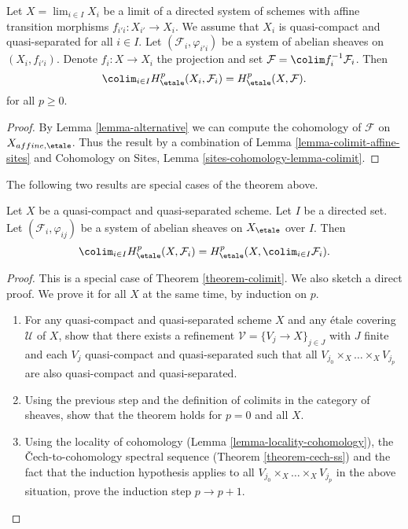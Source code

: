 \begin{theorem}
\label{theorem-colimit}
Let $X = \lim_{i \in I} X_i$ be a limit of a directed system of schemes
with affine transition morphisms $f_{i'i} : X_{i'} \to X_i$. We assume
that $X_i$ is quasi-compact and quasi-separated for all $i \in I$.
Let $(\mathcal{F}_i, \varphi_{i'i})$ be a system of abelian sheaves
on $(X_i, f_{i'i})$. Denote $f_i : X \to X_i$ the projection and set
$\mathcal{F} = \colim f_i^{-1}\mathcal{F}_i$. Then
$$
\colim_{i\in I} H_\etale^p(X_i, \mathcal{F}_i) = H_\etale^p(X, \mathcal{F}).
$$
for all $p \geq 0$.
\end{theorem}

\begin{proof}
By Lemma \ref{lemma-alternative} we can compute the cohomology
of $\mathcal{F}$ on $X_{affine, \etale}$.
Thus the result by a combination of
Lemma \ref{lemma-colimit-affine-sites}
and
Cohomology on Sites, Lemma \ref{sites-cohomology-lemma-colimit}.
\end{proof}

\noindent
The following two results are special cases of the theorem above.

\begin{lemma}
\label{lemma-colimit}
Let $X$ be a quasi-compact and quasi-separated scheme. Let $I$
be a directed set. Let $(\mathcal{F}_i, \varphi_{ij})$ be a system
of abelian sheaves on $X_\etale$ over $I$. Then
$$
\colim_{i\in I} H_\etale^p(X, \mathcal{F}_i) = H_\etale^p(X,
\colim_{i\in I} \mathcal{F}_i).
$$
\end{lemma}

\begin{proof}
This is a special case of Theorem \ref{theorem-colimit}.
We also sketch a direct proof.
We prove it for all $X$ at the same time, by induction on $p$.
\begin{enumerate}
\item
For any quasi-compact and quasi-separated scheme $X$ and any \'etale covering
$\mathcal{U}$ of $X$, show that there exists a refinement
$\mathcal{V} = \{V_j \to X\}_{j\in J}$ with $J$ finite and each $V_j$
quasi-compact and quasi-separated such that all
$V_{j_0} \times_X \ldots \times_X V_{j_p}$ are also
quasi-compact and quasi-separated.
\item
Using the previous step and the definition of colimits in the category of
sheaves, show that the theorem holds for $p = 0$ and all $X$.
\item
Using the locality of cohomology
(Lemma \ref{lemma-locality-cohomology}),
the {\v C}ech-to-cohomology spectral sequence
(Theorem \ref{theorem-cech-ss}) and the fact that the induction
hypothesis applies to all
$V_{j_0} \times_X \ldots \times_X V_{j_p}$
in the above situation, prove the induction step $p \to p + 1$.
\end{enumerate}
\end{proof}

